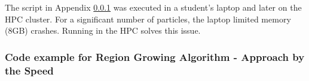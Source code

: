 \documentclass[12pt]{article}
\begin{document}
The script in Appendix \ref{App:App_speed_code} was executed in a student's
laptop and later on the HPC cluster. For a significant number of particles, the laptop limited memory (8GB) crashes. Running in the HPC solves this issue.


\subsubsection{Code example for Region Growing Algorithm - Approach by the Speed} \label{App:App_speed_code}
\tiny

\end{document}
